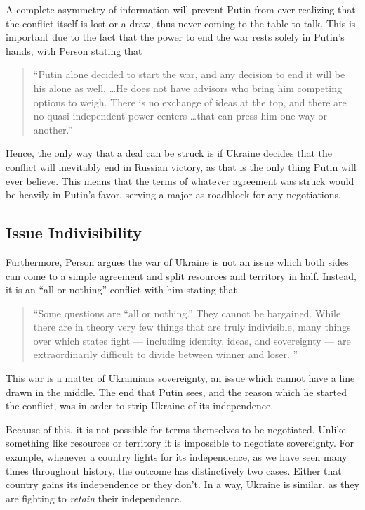 \documentclass{article}
\begin{document}
         A complete asymmetry of information will prevent Putin from ever realizing that the conflict itself is lost or a draw, thus never coming to the table to talk. This is important due to the fact that the power to end the war rests solely in Putin's hands, with Person stating that 

        \begin{quote}
           ``Putin alone decided to start the war, and any decision to end it will be his alone as well. \ldots He does not have advisors who bring him competing options to weigh. There is no exchange of ideas at the top, and there are no quasi-independent power centers \ldots that can press him one way or another.'' \parencite{person_2025}
        \end{quote}

        Hence, the only way that a deal can be struck is if Ukraine decides that the conflict will inevitably end in Russian victory, as that is the only thing Putin will ever believe. This means that the terms of whatever agreement was struck would be heavily in Putin's favor, serving a major as roadblock for any negotiations.
    
    \subsection{Issue Indivisibility}

        Furthermore, Person argues the war of Ukraine is not an issue which both sides can come to a simple agreement and split resources and territory in half. Instead, it is an ``all or nothing'' conflict with him stating that
        
        \begin{quote}
            ``Some questions are ``all or nothing.'' They cannot be bargained. While there are in theory very few things that are truly indivisible, many things over which states fight — including identity, ideas, and sovereignty — are extraordinarily difficult to divide between winner and loser. \parencite{person_2025}''
        \end{quote}
        
        This war is a matter of Ukrainians sovereignty, an issue which cannot have a line drawn in the middle. The end that Putin sees, and the reason which he started the conflict, was in order to strip Ukraine of its independence. 

        Because of this, it is not possible for terms themselves to be negotiated. Unlike something like resources or territory it is impossible to negotiate sovereignty. For example, whenever a country fights for its independence, as we have seen many times throughout history, the outcome has distinctively two cases. Either that country gains its independence or they don't. In a way, Ukraine is similar, as they are fighting to \textit{retain} their independence. 
\end{document}

